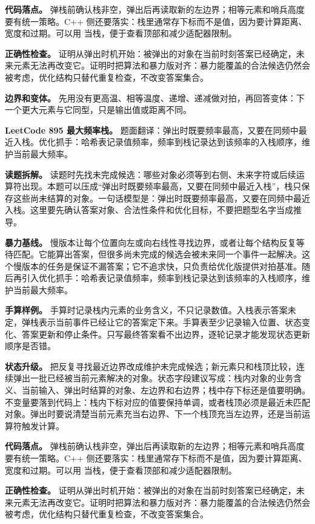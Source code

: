\textbf{代码落点。} 弹栈前确认栈非空，弹出后再读取新的左边界；相等元素和哨兵高度要有统一策略。C++ 侧还要落实：栈里通常存下标而不是值，因为要计算距离、宽度和过期。可以用  当栈，便于查看顶部和减少适配器限制。

\textbf{正确性检查。} 证明从弹出时机开始：被弹出的对象在当前时刻答案已经确定，未来元素无法再改变它。证明时把算法和暴力版对齐：暴力能覆盖的合法候选仍然会被考虑，优化结构只替代重复检查，不改变答案集合。

\textbf{边界和变体。} 先用没有更高温、相等温度、递增、递减做对拍，再回答变体：下一个更大元素与它同型，只是输出值或距离不同。

\noindent\textbf{LeetCode 895 最大频率栈。} 题面翻译：弹出时既要频率最高，又要在同频中最近入栈。优化抓手：哈希表记录值频率，频率到栈记录达到该频率的入栈顺序，维护当前最大频率。

\textbf{读题拆解。} 读题时先找未完成候选：哪些对象必须等到右侧、未来字符或后续运算符出现。本题可以压成“弹出时既要频率最高，又要在同频中最近入栈”，栈只保存这些尚未结算的对象。一句话模型是：弹出时既要频率最高，又要在同频中最近入栈。这里要先确认答案对象、合法性条件和优化目标，不要把题型名字当成推导。

\textbf{暴力基线。} 慢版本让每个位置向左或向右线性寻找边界，或者让每个结构反复等待匹配。它能算出答案，但很多尚未完成的候选会被未来同一个事件一起解决。这个慢版本的任务是保证不漏答案；它不追求快，只负责给优化版提供对拍基准。随后再引入优化抓手：哈希表记录值频率，频率到栈记录达到该频率的入栈顺序，维护当前最大频率。

\textbf{手算样例。} 手算时记录栈内元素的业务含义，不只记录数值。入栈表示答案未定，弹栈表示当前事件已经让它的答案定下来。手算表至少记录输入位置、状态变化、答案更新和停止条件。只写最终答案看不出边界，逐轮记录才能发现状态更新顺序是否错。

\textbf{状态升级。} 把反复寻找最近边界改成维护未完成候选；新元素只和栈顶比较，连续弹出一批已经被当前元素解决的对象。状态字段建议写成：栈内对象的业务含义、当前输入、弹出时结算的对象、左边界和右边界；栈中存下标还是值要明确。不变量要落到代码上：栈内下标对应的值要保持单调，或者栈顶必须是最近未匹配对象。弹出时要说清楚当前元素充当右边界、下一个栈顶充当左边界，还是当前运算符触发计算。

\textbf{代码落点。} 弹栈前确认栈非空，弹出后再读取新的左边界；相等元素和哨兵高度要有统一策略。C++ 侧还要落实：栈里通常存下标而不是值，因为要计算距离、宽度和过期。可以用  当栈，便于查看顶部和减少适配器限制。

\textbf{正确性检查。} 证明从弹出时机开始：被弹出的对象在当前时刻答案已经确定，未来元素无法再改变它。证明时把算法和暴力版对齐：暴力能覆盖的合法候选仍然会被考虑，优化结构只替代重复检查，不改变答案集合。

